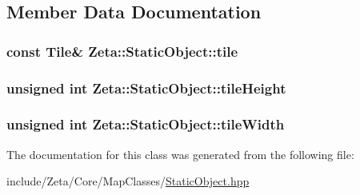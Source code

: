 \subsection{Member Data Documentation}
\hypertarget{classZeta_1_1StaticObject_aae62a6e0faf04194212028767dd96671}{
\subsubsection[{tile}]{\setlength{\rightskip}{0pt plus 5cm}const {\bf Tile}\& Zeta\+::\+Static\+Object\+::tile\hspace{0.3cm}{\ttfamily [private]}}}\label{classZeta_1_1StaticObject_aae62a6e0faf04194212028767dd96671}
\hypertarget{classZeta_1_1StaticObject_a1cb176fcfe2074edffcaedff80f7fd16}{
\subsubsection[{tile\+Height}]{\setlength{\rightskip}{0pt plus 5cm}unsigned int Zeta\+::\+Static\+Object\+::tile\+Height\hspace{0.3cm}{\ttfamily [private]}}}\label{classZeta_1_1StaticObject_a1cb176fcfe2074edffcaedff80f7fd16}
\hypertarget{classZeta_1_1StaticObject_a4d6836b08c51b2807558c39ddc598b33}{
\subsubsection[{tile\+Width}]{\setlength{\rightskip}{0pt plus 5cm}unsigned int Zeta\+::\+Static\+Object\+::tile\+Width\hspace{0.3cm}{\ttfamily [private]}}}\label{classZeta_1_1StaticObject_a4d6836b08c51b2807558c39ddc598b33}


The documentation for this class was generated from the following file\+:\begin{DoxyCompactItemize}
\item 
include/\+Zeta/\+Core/\+Map\+Classes/\hyperlink{StaticObject_8hpp}{Static\+Object.\+hpp}\end{DoxyCompactItemize}
